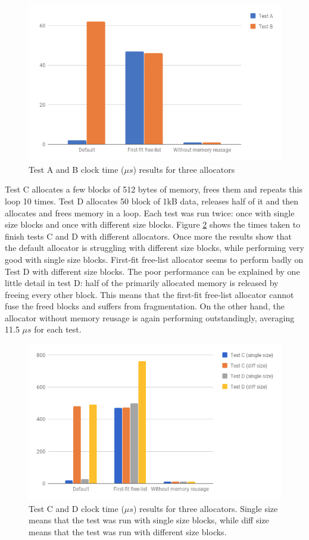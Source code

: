 \documentclass[bsc,frontabs,twoside,singlespacing,parskip,deptreport]{infthesis}     %
\begin{document}
\begin{figure}[H]
	\centering
	\includegraphics[width=12cm]{allocator_test_a}
	\caption{Test A and B clock time (\(\mu s\)) results for three allocators}
	\label{testa_b}
\end{figure}


Test C allocates a few blocks of 512 bytes of memory, frees them and repeats this loop 10 times. Test D allocates 50 block of 1kB data, releases half of it and then allocates and frees memory in a loop. Each test was run twice: once with single size blocks and once with different size blocks. Figure \ref{testc_d} shows the times taken to finish tests C and D with different allocators. Once more the results show that the default allocator is struggling with different size blocks, while performing very good with single size blocks. First-fit free-list allocator seems to perform badly on Test D with different size blocks. The poor performance can be explained by one little detail in test D: half of the primarily allocated memory is released by freeing every other block. This means that the first-fit free-list allocator cannot fuse the freed blocks and suffers from fragmentation. On the other hand, the allocator without memory reusage is again performing outstandingly, averaging 11.5 \(\mu s\) for each test.

\begin{figure}[H]
	\centering
	\includegraphics[width=12cm]{allocator_test_c}
	\caption{Test C and D clock time (\(\mu s\)) results for three allocators. Single size means that the test was run with single size blocks, while diff size means that the test was run with different size blocks.}
	\label{testc_d}
\end{figure}
\end{document}
